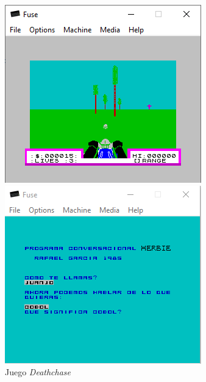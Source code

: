 \documentclass{article}
\begin{document}
\begin{figure}[!htb]
   \begin{minipage}{0.32\textwidth}
     \centering
     \includegraphics[width=\linewidth]{images/deathchase.png}
     \caption{Juego \textit{Deathchase}}\label{Fig:deathchase}
   \end{minipage}\hfill
   \begin{minipage}{0.32\textwidth}
     \centering
     \includegraphics[width=\linewidth]{images/herbie.png}

\end{minipage}
\end{figure}
\end{document}
